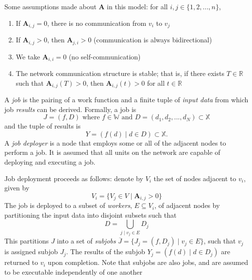 \documentclass[../mthe-493-project-proposal.tex]{subfiles}
\begin{document}
    Some assumptions made about $\mathbf{A}$ in this model: for all $i, j \in \{1, 2, ..., n\}$,

    \begin{enumerate}
        \item If $\mathbf{A}_{i,j} = 0$, there is no communication from $v_i$ to $v_j$
        \item If $\mathbf{A}_{i,j} > 0$, then $\mathbf{A}_{j,i} > 0$ (communication is always bidirectional)
        \item We take $\mathbf{A}_{i,i} = 0$ (no self-communication)
        \item The network communication structure is stable; that is, if there exists $T \in \mathbb{R}$ such that $\mathbf{A}_{i,j}(T) > 0$, then $\mathbf{A}_{i,j}(t) > 0$ for all $t \in \mathbb{R}$
    \end{enumerate}

    A \textit{job} is the pairing of a work function and a finite tuple of \textit{input data} from which job \textit{results} can be derived. Formally, a job is
    \begin{equation*}
        J = (f, D) \text{ where } f \in \mathbb{W} \text{ and } D = (d_1, d_2, ..., d_N) \subset \mathbb{X}
    \end{equation*}
    and the tuple of results is
    \begin{equation*}
        Y = (f(d) \mid d \in D) \subset \mathbb{X}.
    \end{equation*}
    A \textit{job deployer} is a node that employs some or all of the adjacent nodes to perform a job. It is assumed that all units on the network are capable of deploying and executing a job.

    Job deployment proceeds as follows: denote by $V_i$ the set of nodes adjacent to $v_i$, given by
    \begin{equation*}
        V_i = \{V_j \in V \mid \mathbf{A}_{i,j} > 0\}
    \end{equation*}
    The job is deployed to a subset of \textit{workers}, $E \subseteq V_i$, of adjacent nodes by partitioning the input data into disjoint subsets such that
    \begin{equation*}
        D = \bigcup\limits_{j \mid v_j \in E} D_j
    \end{equation*}
    This partitions $J$ into a set of \textit{subjobs} $\overline{J} = \{J_j = (f, D_j) \mid v_j \in E\}$, such that $v_j$ is assigned subjob $J_j$. The results of the subjob $Y_j = (f(d) \mid d \in D_j)$ are returned to $v_i$ upon completion. Note that subjobs are also jobs, and are assumed to be executable independently of one another
\end{document}
